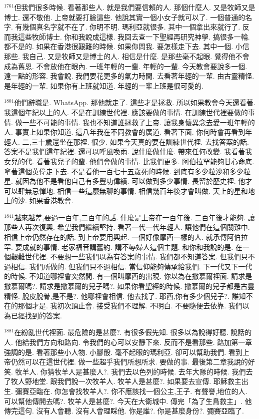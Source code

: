 \documentclass{book}
\begin{document}
$^{1761}$但我們很多時候.
看著那些人.
就是我們要信賴的人.
那個什麼人.
又是牧師又是博士.
還不敬他.
上帝就要打臉這些.
他說其實一個小女子就可以了.
一個普通的名字.
有幾個真名字就不在了.
你明不明.
瑪利亞就很多.
其中一個拿出來就行了.
反而我這些牧師博士.
你和我說成這樣.
我回去查一下聖經再研究神學.
搞很多一輪.
都不是的.
如果在香港很艱難的時候.
如果你問我.
要怎樣走下去.
其中一個.
小信那些.
我自己.
又是牧師又是博士的人.
相信是什麼.
是那些毫不起眼.
覺得他不會成為舊恩.
不會放他在眼內.
一班年輕的一輩.
年輕的一輩.
今天教會要說多一個.
遠一點的形容.
我會說.
我們要花更多的氣力時間.
去看著年輕的一輩.
由古靈精怪.
是年輕的一輩.
如果你有上班就知道.
年輕的一輩上班是很可愛的.

$^{1801}$他們辭職是.
WhatsApp.
那他就走了.
這些才是拯救.
所以如果教會今天還看著.
我這個年紀以上的人.
不是在訓練世代裡.
應該要做的事情.
在訓練世代裡要做的事情.
做一些不可能的事情.
我也不知道誰拯救了上帝.
讓我身懷異念去愛一班年輕的人.
事實上如果你知道.
這八年我在不同教會的廣道.
看著下面.
你何時會再看到年輕人.
二,三十歲還坐在那裡.
很少.
如果今天真的要在訓練世代裡.
去找答案的話.
答案不是我們這年紀裡.
還可以呼風喚雨.
說什麼做什麼.
帶來任何改變.
我看著我女兒的代.
看著我兒子的輩.
他們會做的事情.
比我們更多.
阿伯拉罕能夠甘心命底.
拿著這個英偉走下去.
不是看他一百七十五歲死的時候.
到底有多少粒沙和多少粒星.
就因為他不是看他自己有多豐功偉績.
可以做到多少事情.
長留於歷史裡.
他才可以肆無忌憚地.
相信一些這麼無聊的事情.
相信幾百年後才會叫做.
天上的星和地上的沙.
如果香港教會.

$^{1841}$越來越差,要過一百年,二百年的話.
什麼是上帝在一百年後.
二百年後才能夠.
讓那些人再次復興.
希望我們繼續堅持.
看著一代一代年輕人.
讓他們在這個關難中.
相信上帝仍然存在的話.
到上帝要用興起.
一個好像摩西一樣的人.
就承傳阿伯拉罕.
要成就的事情.
老家福音講舊約.
講不辱婦人這個主題.
和你和我說的是.
在一個艱難世代裡.
不要想一些我們以為有答案的事情.
我們都不知道答案.
但我們只不過相信.
我們所做的.
但我們只不過相信.
當信仰能夠傳承給我們.
下一代又下一代的時候.
不知道哪裡會突然間.
有一個叫摩西的出現.
你以為在撒慕爾裡面.
請求是撒慕爾嗎?.
請求是撒慕爾的兒子嗎?.
如果你看聖經的時候.
撒慕爾的兒子都是古靈精怪.
脫皮脫骨,是不是?.
他哪裡會相信.
他去找了.
耶西,你有多少個兒子?.
誰知不在的那個才是.
我初次頂止會.
接受我們不理解.
不明白.
不要隨便去依靠.
我們以為已經找到的答案.

$^{1881}$在紛亂世代裡面.
最危險的是甚麼?.
有很多假先知.
很多以為說得好聽.
說話的人.
他給我們方向和路向.
令我們的心可以安靜下來.
反而不是看那些.
路加第一章強調的是.
看著那些小人物.
小腳骰.
毫不起眼的瑪利亞.
卻可以幫助我們.
看到上帝仍然可以在這世代裡.
做一些超乎我們所想所求.
要做的事.
最後第二章我說的好笑.
牧羊人.
你猜牧羊人是甚麼人?.
我們去以色列的時候.
去年大隊的時候.
我們去了牧人野地堂.
跟我們說一次牧羊人.
牧羊人是甚麼?.
如果要去宣傳.
耶穌救主出生.
彌賽亞臨在.
你怎會找牧羊人?.
你不應該找一個公主,王子.
有聲譽,地位的人.
可以幫他傳開去嗎?.
牧羊人是甚麼?.
今天在大衛城中.
傳完「為了生鳥救主」.
他傳完這句.
沒有人會聽.
沒有人會理睬他.
你是誰?.
你是甚麼身份?.
彌賽亞臨了.
\end{document}
